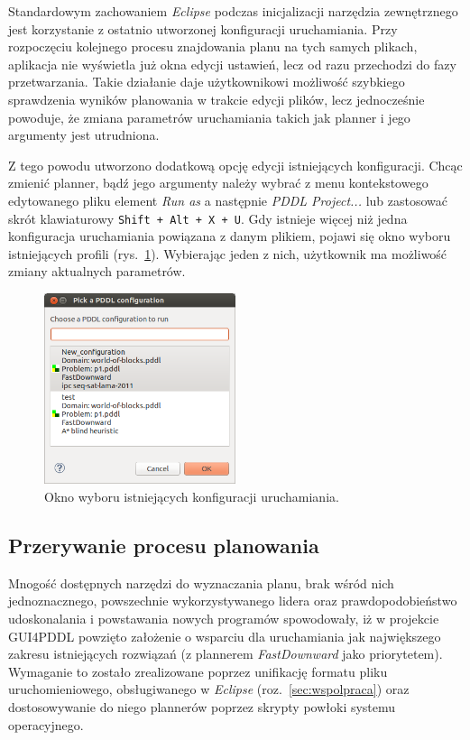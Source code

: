 Standardowym zachowaniem \textit{Eclipse} podczas inicjalizacji narzędzia zewnętrznego jest korzystanie z ostatnio utworzonej konfiguracji uruchamiania. Przy rozpoczęciu kolejnego procesu znajdowania planu na tych samych plikach, aplikacja nie wyświetla już okna edycji ustawień, lecz od razu przechodzi do fazy przetwarzania. Takie działanie daje użytkownikowi możliwość szybkiego sprawdzenia wyników planowania w trakcie edycji plików, lecz jednocześnie powoduje, że zmiana parametrów uruchamiania takich jak planner i jego argumenty jest utrudniona.

Z tego powodu utworzono dodatkową opcję edycji istniejących konfiguracji. Chcąc zmienić planner, bądź jego argumenty należy wybrać z menu kontekstowego edytowanego pliku element \textit{Run as} a następnie \textit{PDDL Project...} lub zastosować skrót klawiaturowy \texttt{Shift~+~Alt~+~X~+~U}. Gdy istnieje więcej niż jedna konfiguracja uruchamiania powiązana z danym plikiem, pojawi się okno wyboru istniejących profili (rys.~\ref{fig:run_configuration_choice}). Wybierając jeden z nich, użytkownik ma możliwość zmiany aktualnych parametrów.

\begin{figure}[h!]
    \centering
    \includegraphics[width=0.5\textwidth]{img/run_configuration_choice}
    \caption{Okno wyboru istniejących konfiguracji uruchamiania.}
    \label{fig:run_configuration_choice}
\end{figure}

\subsection{Przerywanie procesu planowania}
\label{subsec:przerywanie}

Mnogość dostępnych narzędzi do wyznaczania planu, brak wśród nich jednoznacznego, powszechnie wykorzystywanego lidera oraz prawdopodobieństwo udoskonalania i powstawania nowych programów spowodowały, iż w projekcie GUI4PDDL powzięto założenie o wsparciu dla uruchamiania jak największego zakresu istniejących rozwiązań (z plannerem \textit{FastDownward} jako priorytetem). Wymaganie to zostało zrealizowane poprzez unifikację formatu pliku uruchomieniowego, obsługiwanego w \textit{Eclipse} (roz.~\ref{sec:wspolpraca}) oraz dostosowywanie do niego plannerów poprzez skrypty powłoki systemu operacyjnego.

